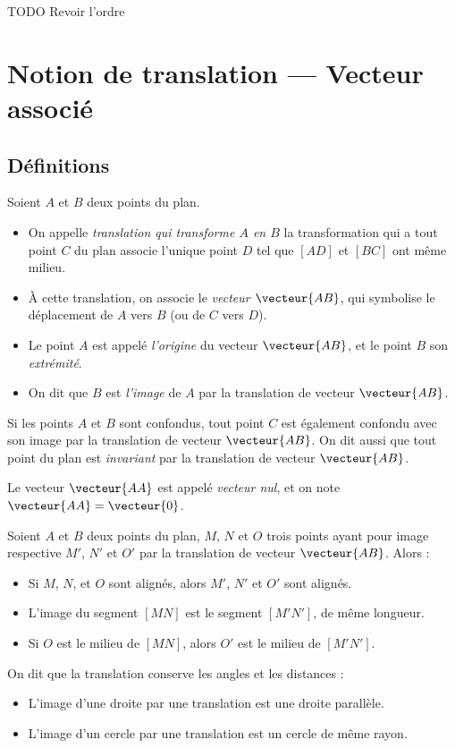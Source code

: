 TODO Revoir l'ordre

\section{Notion de translation --- Vecteur associé}
\subsection{Définitions}

\begin{definition}
  Soient $A$ et $B$ deux points du plan.
  \begin{itemize}
    \item On appelle \emph{translation qui transforme $A$ en $B$} la transformation qui a tout point $C$ du plan associe l'unique point $D$ tel que $[AD]$ et $[BC]$ ont même milieu.
    \item À cette translation, on associe le \emph{vecteur $\vecteur{AB}$}, qui symbolise le déplacement de $A$ vers $B$ (ou de $C$ vers $D$).
    \item Le point $A$ est appelé \emph{l'origine} du vecteur $\vecteur{AB}$, et le point $B$ son \emph{extrémité}.
    \item On dit que $B$ est \emph{l'image} de $A$ par la translation de vecteur $\vecteur{AB}$.
  \end{itemize}
\end{definition}

\begin{remarque}
  Si les points $A$ et $B$ sont confondus, tout point $C$ est également confondu avec son image par la translation de vecteur $\vecteur{AB}$. On dit aussi que tout point du plan est \emph{invariant} par la translation de vecteur $\vecteur{AB}$.

  Le vecteur $\vecteur{AA}$ est appelé \emph{vecteur nul}, et on note $\vecteur{AA}=\vecteur{0}$.
\end{remarque}

\begin{propriete}
  Soient $A$ et $B$ deux points du plan, $M$, $N$ et $O$ trois points ayant pour image respective $M'$, $N'$ et $O'$ par la translation de vecteur $\vecteur{AB}$. Alors :
  \begin{itemize}
    \item Si $M$, $N$, et $O$ sont alignés, alors $M'$, $N'$ et $O'$ sont alignés.
    \item L'image du segment $[MN]$ est le segment $[M'N']$, de même longueur.
    \item Si $O$ est le milieu de $[MN]$, alors $O'$ est le milieu de $[M'N']$.
  \end{itemize}

  On dit que la translation conserve les angles et les distances :

  \begin{itemize}
    \item L'image d'une droite par une translation est une droite parallèle.
    \item L'image d'un cercle par une translation est un cercle de même rayon.
  \end{itemize}
\end{propriete}

